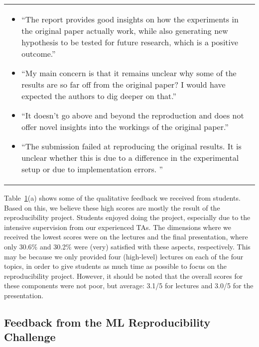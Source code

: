 \begin{table}[htp]
\begin{tabular}{@{}l@{}}
\begin{minipage}[t]{\columnwidth}
\begin{itemize}[leftmargin=*]
\item ``The report provides good insights on how the experiments in the original paper actually work, while also generating new hypothesis to be tested for future research, which is a positive outcome.''
\item ``My main concern is that it remains unclear why some of the results are so far off from the original paper? I would have expected the authors to dig deeper on that.''
\item ``It doesn't go above and beyond the reproduction and does not offer novel insights into the workings of the original paper.''
\item ``The submission failed at reproducing the original results. It is unclear whether this is due to a difference in the experimental setup or due to implementation errors. ''
\end{itemize}
\end{minipage}
\end{tabular}
\label{tab:feedback}
\end{table}



Table~\ref{tab:feedback}(a) shows some of the qualitative feedback we received from students. 
Based on this, we believe these high scores are mostly the result of the reproducibility project. 
Students enjoyed doing the project, especially due to the intensive supervision from our experienced TAs. 
The dimensions where we received the lowest scores were on the lectures and the final presentation, where only 30.6\% and 30.2\% were (very) satisfied with these aspects, respectively. 
This may be because we only provided four (high-level) lectures on each of the four topics, in order to give students as much time as possible to focus on the reproducibility project. 
However, it should be noted that the overall scores for these components were not poor, but average: 3.1/5 for lectures and 3.0/5 for the presentation. 

\subsection{Feedback from the ML Reproducibility Challenge}
\label{section:feedback-mlrc}

